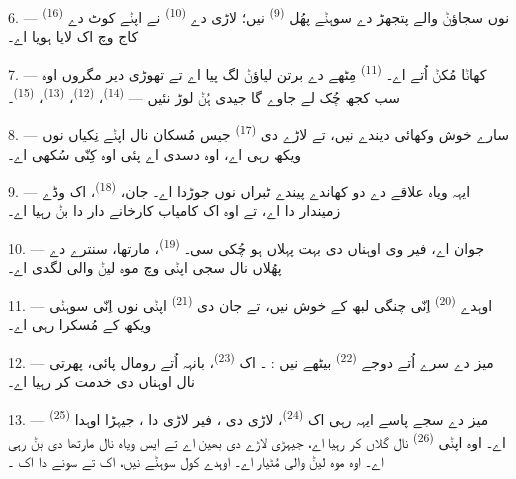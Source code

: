 6. ---  \textsuperscript{(16)} نوں سجاؤݨ والے پتجھڑ دے سوہݨے پھُل
 \textsuperscript{(9)} نیں؛ لاڑی دے 
\textsuperscript{(10)} نے اپݨے کوٹ دے کاج وچ اک لایا ہویا اے۔

7. --- کھاݨا مُکݨ اُتے اے۔  \textsuperscript{(11)} مِٹھے دے برتن
لیاؤݨ لگ پیا اے تے تھوڑی دیر مگروں اوہ سب کجھ چُک لے جاوے گا جیدی ہُݨ لوڑ نئیں
—  \textsuperscript{(14)}،  \textsuperscript{(12)}،
 \textsuperscript{(13)}، 
\textsuperscript{(15)}۔

\VUsaut{3.0mm}

8. --- سارے خوش وکھائی دیندے نیں، تے لاڑے دی  \textsuperscript{(17)}
جیس مُسکان نال اپݨے نِکیاں نوں ویکھ رہی اے، اوہ دسدی اے پئی اوہ کِنّی سُکھی اے۔

9. --- ایہہ ویاہ علاقے دے دو کھاندے پیندے ٹبراں نوں جوڑدا اے۔ جان،
 \textsuperscript{(18)}، اک وڈے زمیندار دا  اے، تے
اوہ اک کامیاب کارخانے دار دا  بݨ رہیا اے۔

10. ---  جوان اے، فیر وی اوہناں دی  بہت پہلاں ہو
چُکی سی۔  \textsuperscript{(19)}، مارتھا، سنترے دے پھُلاں نال
سجی اپݨی  وچ موہ لیݨ والی لگدی اے۔

11. --- اوہدے  \textsuperscript{(20)} اِنّی چنگی 
لبھ کے خوش نیں، تے جان دی  \textsuperscript{(21)} اپݨی 
نوں اِنّی سوہݨی ویکھ کے مُسکرا رہی اے۔

12. --- میز دے سرے اُتے دوجے  \textsuperscript{(22)} بیٹھے نیں :
۔ اک  \textsuperscript{(23)}،
بانہہ اُتے رومال پائی، پھرتی نال اوہناں دی خدمت کر رہیا اے۔

\VUsaut{3.0mm}

13. --- میز دے سجے پاسے ایہہ رہی اک  \textsuperscript{(24)}، لاڑی
دی ، فیر لاڑی دا ، جیہڑا اوہدا 
\textsuperscript{(25)} اے۔ اوہ اپݨی  \textsuperscript{(26)} نال گلاں
کر رہیا اے، جیہڑی لاڑے دی بھین اے تے ایس ویاہ نال مارتھا دی  بݨ
رہی اے۔ اوہ موہ لیݨ والی مُٹیار اے۔ اوہدے کول سوہݨے  نیں، اک
 تے سونے دا اک ۔

